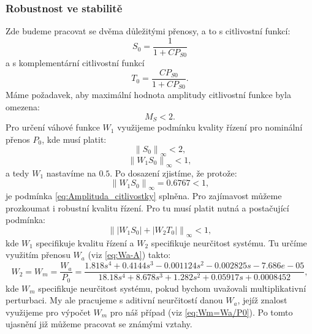 \documentclass[a4paper,11pt]{article}
\begin{document}
\newpage
\subsubsection{Robustnost ve stabilitě}
Zde budeme pracovat se dvěma důležitými přenosy, a to s citlivostní funkcí:
\begin{equation}
S_{0}=\frac{1}{1+CP_{S0}}
\end{equation}
a s komplementární citlivostní funkcí
\begin{equation}
T_{0}=\frac{CP_{S0}}{1+CP_{S0}}.
\end{equation}
Máme požadavek, aby maximální hodnota amplitudy citlivostní funkce byla omezena:
\begin{equation}\label{eq:Amplituda_citlivostky} 
M_{S}<2.
\end{equation}
Pro určení váhové funkce $ W_{1} $ využijeme podmínku kvality řízení pro nominální přenos $ P_{0} $, kde musí platit:
\begin{equation}
\left \| S_{0} \right \|_{\infty }<2,
\end{equation}
\begin{equation}
\left \| W_{1}S_{0} \right \|_{\infty }<1,
\end{equation}
a tedy $  W_{1} $ nastavíme na $ 0.5 $. Po dosazení zjistíme, že protože:
\begin{equation}
\left \| W_{1}S_{0} \right \|_{\infty }=0.6767<1,
\end{equation}
je podmínka \ref{eq:Amplituda_citlivostky} splněna.
Pro zajímavost můžeme prozkoumat i robustní kvalitu řízení. Pro tu musí platit nutná a postačující podmínka:
\begin{equation}\label{eq:Robustni_kvalita_podminka} 
\left \| \left | W_{1}S_{0} \right |+ \left | W_{2}T_{0} \right |\right \|_{\infty }< 1,
\end{equation}
kde $  W_{1} $ specifikuje kvalitu řízení a $  W_{2} $ specifikuje neurčitost systému. Tu určíme využitím přenosu $  W_{a} $ (viz \ref{eq:Wa-A}) takto:
\begin{equation}\label{eq:Wm=Wa/P0} 
W_{2}=W_{m}=\frac{W_{a}}{P_{0}}=\frac{1.818 s^{4} + 0.4144 s^{3} - 0.001124 s^{2} - 0.002825 s - 7.686e-05}{18.18 s^{4} + 8.678 s^{3} + 1.282 s^{2} + 0.05917 s + 0.0008452},
\end{equation}
kde $ W_{m} $ specifikuje neurčitost systému, pokud bychom uvažovali multiplikativní perturbaci. My ale pracujeme s aditivní neurčitostí danou $ W_{a} $, jejíž znalost využijeme pro výpočet $ W_{m} $ pro náš případ (viz \ref{eq:Wm=Wa/P0}). Po tomto ujasnění již můžeme pracovat se známými vztahy.
\end{document}
